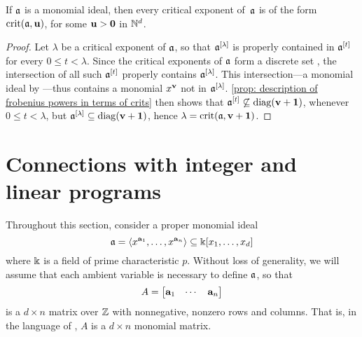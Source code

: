 \documentclass[11pt]{amsart}
\begin{document}
\begin{corollary}
   \label{cor: every crit is crit wrt diagonal ideal}
   If $\mathfrak{a}$ is a monomial ideal, then every critical exponent of~$\mathfrak{a}$ is of the form $\operatorname{crit}(\mathfrak{a},\mathbf{u})$, for some $\mathbf{u} > \mathbf{0}$ in $\mathbb{N}^d$.
\end{corollary}

\begin{proof}
   Let $\lambda$ be a critical exponent of $\mathfrak{a}$, so that $\mathfrak{a}^{[\lambda]}$ is properly contained in $\mathfrak{a}^{[t]}$ for every $0 \le t <\lambda$.
   Since the critical exponents of $\mathfrak{a}$ form a discrete set \cite[Corollary~5.8]{hernandez+etal.frobenius_powers}, the intersection of all such $\mathfrak{a}^{[t]}$ properly contains $\mathfrak{a}^{[\lambda]}$.
   This intersection---a monomial ideal by ---thus contains a monomial $x^{\mathbf{v}}$ not in $\mathfrak{a}^{[\lambda]}$.
   \cref{prop: description of frobenius powers in terms of crits} then shows that $\mathfrak{a}^{[t]}\not\subseteq \operatorname{diag}(\mathbf{v}+\mathbf{1})$, whenever $0\le t < \lambda$, but $\mathfrak{a}^{[\lambda]} \subseteq \operatorname{diag}(\mathbf{v}+\mathbf{1})$, hence $\lambda = \operatorname{crit}(\mathfrak{a},\mathbf{v}+\mathbf{1})$.
\end{proof}



\newpage
\section{Connections with integer and linear programs}
\label{sec: LPs}

Throughout this section, consider a proper monomial ideal 
\[ \mathfrak{a} = \langle x^{\mathbf{a}_1}, \ldots, x^{\mathbf{a}_n} \rangle \subseteq \Bbbk[x_1, \ldots, x_d] \]
where $\Bbbk$ is a field of prime characteristic $p$.  Without loss of generality, we will assume that each ambient variable is necessary to define $\mathfrak{a}$, so that \[ A = \begin{bmatrix} \mathbf{a}_1 & \cdots & \mathbf{a}_n \end{bmatrix} \] is a $d \times n$ matrix over $\mathbb{Z}$ with nonnegative, nonzero rows and columns.  That is, in the language of , $A$ is a $d \times n$ monomial matrix.   
\end{document}

